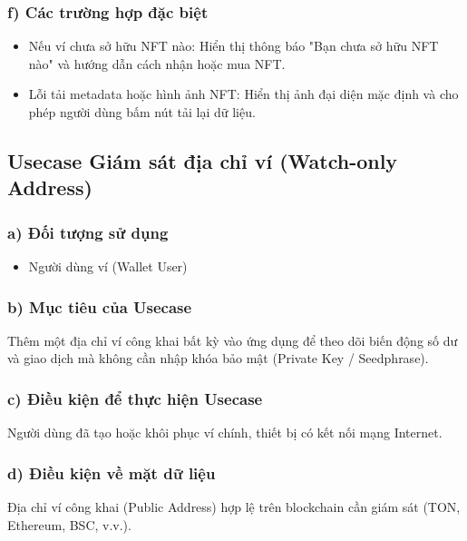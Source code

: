 \documentclass[a4paper]{report}
\begin{document}
\subsubsection{f) Các trường hợp đặc biệt}
\begin{itemize}
    \item Nếu ví chưa sở hữu NFT nào: Hiển thị thông báo "Bạn chưa sở hữu NFT nào" và hướng dẫn cách nhận hoặc mua NFT.
    \item Lỗi tải metadata hoặc hình ảnh NFT: Hiển thị ảnh đại diện mặc định và cho phép người dùng bấm nút tải lại dữ liệu.
\end{itemize}

\subsection{Usecase Giám sát địa chỉ ví (Watch-only Address)}

\subsubsection{a) Đối tượng sử dụng}
\begin{itemize}
    \item Người dùng ví (Wallet User)
\end{itemize}

\subsubsection{b) Mục tiêu của Usecase}
Thêm một địa chỉ ví công khai bất kỳ vào ứng dụng để theo dõi biến động số dư và giao dịch mà không cần nhập khóa bảo mật (Private Key / Seedphrase).

\subsubsection{c) Điều kiện để thực hiện Usecase}
Người dùng đã tạo hoặc khôi phục ví chính, thiết bị có kết nối mạng Internet.

\subsubsection{d) Điều kiện về mặt dữ liệu}
Địa chỉ ví công khai (Public Address) hợp lệ trên blockchain cần giám sát (TON, Ethereum, BSC, v.v.).
\end{document}
